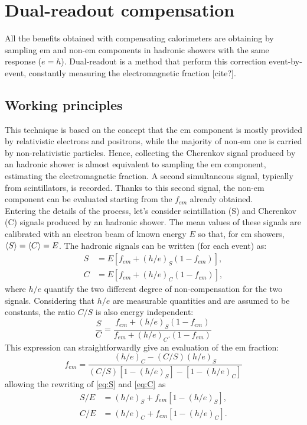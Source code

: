 \section{Dual-readout compensation}\label{sec:DRComp}
All the benefits obtained with compensating calorimeters are obtaining by sampling em and non-em components in hadronic showers with the same response ($e=h$). Dual-readout is a method that perform this correction event-by-event, constantly measuring the electromagnetic fraction [cite?]. 

\subsection{Working principles}
This technique is based on the concept that the em component is mostly provided by relativistic electrons and positrons, while the majority of non-em one is carried by non-relativistic particles. Hence, collecting the Cherenkov signal produced by an hadronic shower is almost equivalent to sampling the em component, estimating the electromagnetic fraction. A second simultaneous signal, typically from scintillators, is recorded. Thanks to this second signal, the non-em component can be evaluated starting from the $f_{em}$ already obtained.\\

Entering the details of the process, let's consider scintillation (S) and Cherenkov (C) signals produced by an hadronic shower. The mean values of these signals are calibrated with an electron beam of known energy $E$ so that, for em showers, $\expval{S} = \expval{C} = E$. The hadronic signals can be written (for each event) as:
\begin{align}
    S &= E \left[f_{em} + (h/e)_S (1-f_{em}) \right], \label{eq:S} \\
    C &= E \left[f_{em} + (h/e)_C (1-f_{em}) \right], \label{eq:C}
\end{align}
where $h/e$ quantify the two different degree of non-compensation for the two signals. Considering that $h/e$ are measurable quantities and are assumed to be constants, the ratio $C/S$ is also energy independent:
\begin{equation}
    \frac{S}{C} = \frac{f_{em} + (h/e)_S (1-f_{em})}{f_{em} + (h/e)_C. (1-f_{em})} \label{eq:em_frac}
\end{equation}
This expression can straightforwardly give an evaluation of the em fraction:
\begin{equation}
    f_{em} = \frac{(h/e)_C-(C/S)(h/e)_S}{(C/S)\left[1-(h/e)_S\right]-\left[1-(h/e)_C\right]}
\end{equation}
allowing the rewriting of \ref{eq:S} and \ref{eq:C} as
\begin{align}
    S/E &= (h/e)_S + f_{em}\left[1-(h/e)_S\right], \label{eq:S2} \\
    C/E &= (h/e)_C + f_{em}\left[1-(h/e)_C\right]. \label{eq:C2}
\end{align}

